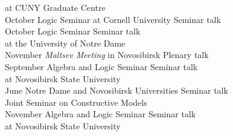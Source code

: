 \documentclass[12pt]{article}
\begin{document}
\begin{tabbing}
{                   \>                 \> at CUNY Graduate Centre\\
October              \> Logic Seminar at Cornell University                                      \> Seminar talk\\
October              \> Logic Seminar                                                                      \> Seminar talk\\
                 \>                  \> at the University of Notre Dame\\
November          \> {\em Maltsev Meeting} in Novosibirsk                                             \> Plenary talk\\
September         \> Algebra and Logic Seminar                                                    \> Seminar talk\\
        \>                          \> at Novosibirsk State University\\
June                   \> Notre Dame and Novosibirsk Universities                              \> Seminar talk\\
           \>                        \> Joint Seminar on Constructive Models\\
November          \> Algebra and Logic Seminar                                                    \> Seminar talk\\
                   \>                \> at Novosibirsk State University\\
}
{}
\end{tabbing}
\end{document}
